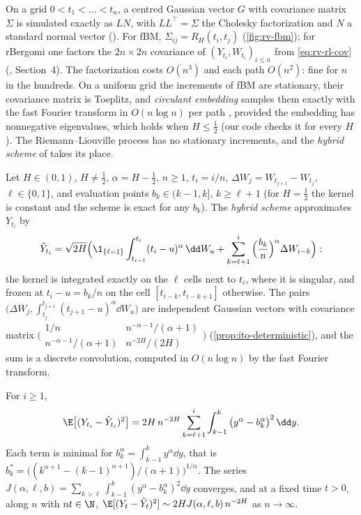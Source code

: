 On a grid $0<t_1<\dots<t_n$, a centred Gaussian vector $G$ with covariance matrix $\Sigma$ is simulated
exactly as $LN$, with $LL^\top=\Sigma$ the Cholesky factorization and $N$ a standard normal vector
(). For fBM, $\Sigma_{ij}=R_H(t_i,t_j)$ (\cref{fig:rv-fbm}); for rBergomi one factors
the $2n\times2n$ covariance of $(Y_{t_i},W_{t_i})_{i\le n}$ from \eqref{eq:rv-rl-cov}
(\textcite{bayer-friz-gatheral-2016}, Section~4). The factorization costs $O(n^3)$ and each path $O(n^2)$:
fine for $n$ in the hundreds. On a uniform grid the increments of fBM are stationary, their covariance matrix
is Toeplitz, and \emph{circulant embedding} samples them exactly with the fast Fourier transform in
$O(n\log n)$ per path \citep{davies-harte-1987}, provided the embedding has nonnegative eigenvalues, which
holds when $H\le\frac12$ \citep{craigmile-2003} (our code checks it for every $H$). The Riemann--Liouville process has no stationary
increments, and the \emph{hybrid scheme} of \textcite{bennedsen-lunde-pakkanen-2017} takes its place.

\begin{definition}\label{def:rv-hybrid}
Let $H\in(0,1)$, $H\ne\frac12$, $\alpha=H-\frac12$, $n\ge1$, $t_i=i/n$, $\Delta W_j=W_{t_{j+1}}-W_{t_j}$, $\ell\in\{0,1\}$,
and evaluation points $b_k\in(k-1,k]$, $k\ge\ell+1$ (for $H=\frac12$ the kernel is constant and the scheme is exact
for any $b_k$). The \emph{hybrid scheme} approximates $Y_{t_i}$ by
\[
  \hat Y_{t_i}=\sqrt{2H}\Big(\1_{\{\ell=1\}}\int_{t_{i-1}}^{t_i}(t_i-u)^\alpha\,\dd W_u
  +\sum_{k=\ell+1}^i\Big(\frac{b_k}n\Big)^\alpha\Delta W_{i-k}\Big):
\]
the kernel is integrated exactly on the $\ell$ cells next to $t_i$, where it is singular, and frozen at
$t_i-u=b_k/n$ on the cell $[t_{i-k},t_{i-k+1}]$ otherwise. The pairs $\big(\Delta W_j,\int_{t_j}^{t_{j+1}}(t_{j+1}-u)^\alpha\dd W_u\big)$
are independent Gaussian vectors with covariance matrix
$\big(\begin{smallmatrix}1/n&n^{-\alpha-1}/(\alpha+1)\\n^{-\alpha-1}/(\alpha+1)&n^{-2H}/(2H)\end{smallmatrix}\big)$
(\cref{prop:ito-deterministic}), and the sum is a discrete convolution, computed in $O(n\log n)$ by the fast Fourier
transform.
\end{definition}

\begin{proposition}\label{prop:rv-hybrid}
For $i\ge1$,
\begin{equation}\label{eq:rv-hybrid-mse}
  \E\big[(Y_{t_i}-\hat Y_{t_i})^2\big]=2H\,n^{-2H}\sum_{k=\ell+1}^i\int_{k-1}^k\big(y^\alpha-b_k^\alpha\big)^2\,\dd y .
\end{equation}
Each term is minimal for $b_k^\alpha=\int_{k-1}^ky^\alpha\dd y$, that is
$b_k^*=\big((k^{\alpha+1}-(k-1)^{\alpha+1})/(\alpha+1)\big)^{1/\alpha}$. The series
$J(\alpha,\ell,b)=\sum_{k>\ell}\int_{k-1}^k(y^\alpha-b_k^\alpha)^2\dd y$ converges, and at a fixed time $t>0$, along
$n$ with $nt\in\N$, $\E[(Y_t-\hat Y_t)^2]\sim2HJ(\alpha,\ell,b)\,n^{-2H}$ as $n\to\infty$.
\end{proposition}

